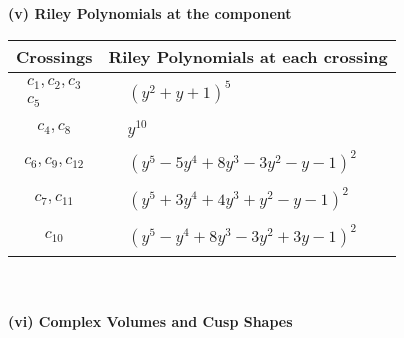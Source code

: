 \documentclass[1p]{elsarticle_modified}
\theoremstyle{definition}
\begin{document}
\newpage\renewcommand{\arraystretch}{1}
\flushleft \textbf{(v) Riley Polynomials at the component}\newline \\
\begin{tabular}{m{50pt}|m{274pt}}
Crossings & \hspace{64pt}Riley Polynomials at each crossing \\
\hline $$\begin{aligned}c_{1},c_{2},c_{3}\\c_{5}\end{aligned}$$&$\begin{aligned}
&(y^2+y+1)^5
\end{aligned}$\\
\hline $$\begin{aligned}c_{4},c_{8}\end{aligned}$$&$\begin{aligned}
&y^{10}
\end{aligned}$\\
\hline $$\begin{aligned}c_{6},c_{9},c_{12}\end{aligned}$$&$\begin{aligned}
&(y^5-5 y^4+8 y^3-3 y^2- y-1)^2
\end{aligned}$\\
\hline $$\begin{aligned}c_{7},c_{11}\end{aligned}$$&$\begin{aligned}
&(y^5+3 y^4+4 y^3+y^2- y-1)^2
\end{aligned}$\\
\hline $$\begin{aligned}c_{10}\end{aligned}$$&$\begin{aligned}
&(y^5- y^4+8 y^3-3 y^2+3 y-1)^2
\end{aligned}$\\
\hline
\end{tabular}\\~\\
\newpage\flushleft \textbf{(vi) Complex Volumes and Cusp Shapes}
\end{document}
